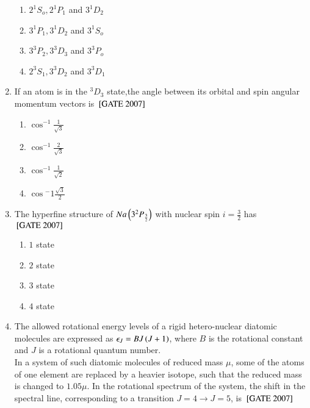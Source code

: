 \documentclass[journal]{IEEEtran}
\begin{document}
\begin{enumerate}
\begin{multicols}{2}
\begin{enumerate}
    \item $2^1S_o,2^1P_1$ and $3^1D_2$
     \item $3^1P_1,3^1D_2$ and $3^1S_o$
      \item $3^3P_2,3^3D_3$ and $3^3P_o$
       \item $2^3S_1,3^3D_2$ and $3^3D_1$
\end{enumerate}
\end{multicols}
\item If an atom is in the ${}^3D_3$ state,the angle between its orbital and spin angular momentum vectors  is \hfill{${}\left[\text{GATE 2007}\right]$} \begin{multicols}{4}
\begin{enumerate}
    \item $\cos^{-1}{\frac{1}{\sqrt{3}}}$
     \item $\cos^{-1}\frac{2}{\sqrt{3}}$
      \item $\cos^{-1}\frac{1}{\sqrt{2}}$
       \item $\cos{^-1}\frac{\sqrt{3}}{2}$
\end{enumerate}
\end{multicols}
\item The hyperfine structure of $Na\left(3^2P_{\frac{3}{2}}\right)$ with nuclear spin $i=\frac{3}{2}$ has \hfill{${}\left[\text{GATE 2007}\right]$} 
\begin{multicols}{4}
\begin{enumerate}
    \item $1$ state
    \item $2$ state
    \item $3$ state
    \item $4$ state
\end{enumerate}
\end{multicols}
\item The allowed rotational energy levels of a rigid hetero-nuclear diatomic molecules are expressed as $\epsilon_J=BJ\left(J+1\right)$, where $B$ is the rotational constant and $J$ is a rotational quantum number.\\
In a system of such diatomic molecules of reduced mass $\mu$, some of the atoms of one element are replaced by a heavier isotope, such that the reduced mass is changed to $1.05\mu$. In the rotational spectrum of the system, the shift in the spectral line, corresponding to a transition $J=4\xrightarrow{}J=5$, is \hfill{${}\left[\text{GATE 2007}\right]$} 


\end{enumerate}
\end{document}
